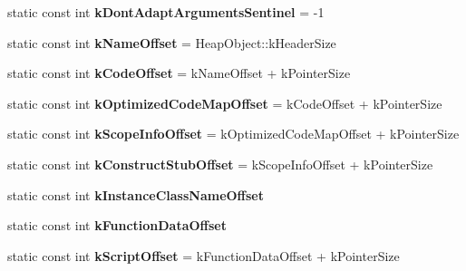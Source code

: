 \begin{DoxyCompactItemize}
\item 
\hypertarget{classv8_1_1internal_1_1_shared_function_info_a64fb3ac3cd435626512d56ffb031af0f}{}static const int {\bfseries k\+Dont\+Adapt\+Arguments\+Sentinel} = -\/1\label{classv8_1_1internal_1_1_shared_function_info_a64fb3ac3cd435626512d56ffb031af0f}

\item 
\hypertarget{classv8_1_1internal_1_1_shared_function_info_a7ea21b5d46c5e7f44e66e3d26d1b600f}{}static const int {\bfseries k\+Name\+Offset} = Heap\+Object\+::k\+Header\+Size\label{classv8_1_1internal_1_1_shared_function_info_a7ea21b5d46c5e7f44e66e3d26d1b600f}

\item 
\hypertarget{classv8_1_1internal_1_1_shared_function_info_ac7fe6404f9b3b09d90e90daa447751fb}{}static const int {\bfseries k\+Code\+Offset} = k\+Name\+Offset + k\+Pointer\+Size\label{classv8_1_1internal_1_1_shared_function_info_ac7fe6404f9b3b09d90e90daa447751fb}

\item 
\hypertarget{classv8_1_1internal_1_1_shared_function_info_a0994b68019409d0eb68a285ee9277cfc}{}static const int {\bfseries k\+Optimized\+Code\+Map\+Offset} = k\+Code\+Offset + k\+Pointer\+Size\label{classv8_1_1internal_1_1_shared_function_info_a0994b68019409d0eb68a285ee9277cfc}

\item 
\hypertarget{classv8_1_1internal_1_1_shared_function_info_a51386ec5e82d6a4ca1f05663ea80de9d}{}static const int {\bfseries k\+Scope\+Info\+Offset} = k\+Optimized\+Code\+Map\+Offset + k\+Pointer\+Size\label{classv8_1_1internal_1_1_shared_function_info_a51386ec5e82d6a4ca1f05663ea80de9d}

\item 
\hypertarget{classv8_1_1internal_1_1_shared_function_info_a28d5211725c2457c7243651a8ad60793}{}static const int {\bfseries k\+Construct\+Stub\+Offset} = k\+Scope\+Info\+Offset + k\+Pointer\+Size\label{classv8_1_1internal_1_1_shared_function_info_a28d5211725c2457c7243651a8ad60793}

\item 
static const int {\bfseries k\+Instance\+Class\+Name\+Offset}
\item 
static const int {\bfseries k\+Function\+Data\+Offset}
\item 
\hypertarget{classv8_1_1internal_1_1_shared_function_info_a1fdab5516ff08f6876cffc0a75e18c44}{}static const int {\bfseries k\+Script\+Offset} = k\+Function\+Data\+Offset + k\+Pointer\+Size\label{classv8_1_1internal_1_1_shared_function_info_a1fdab5516ff08f6876cffc0a75e18c44}


\end{DoxyCompactItemize}
